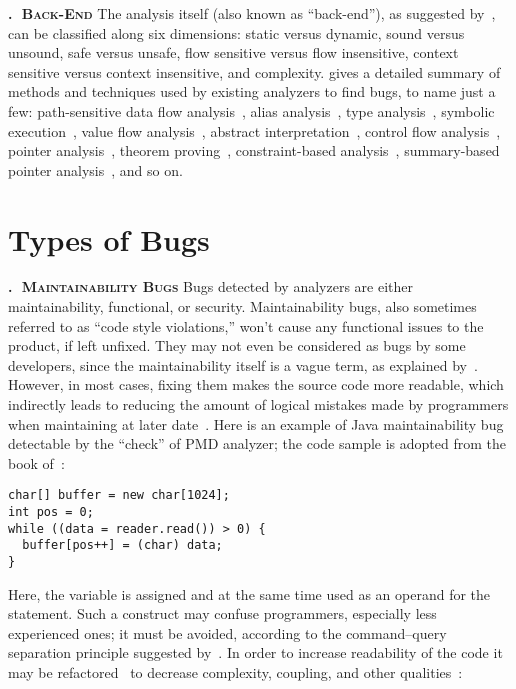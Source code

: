 \documentclass[nosecurity,nobrand]{huawei}
\newcounter{sector}[section]
\renewcommand\thesector{\thesection.\arabic{sector}}
\newcommand{\sector}[1]{\refstepcounter{sector}\vspace{6pt}\textbf{\textsc{\thesector $\;$ #1}}\quad}
\begin{document}
\sector{Back-End}
The analysis itself (also known as ``back-end''),
as suggested by~\citet{binkley2007source},
can be classified along six dimensions: static versus dynamic, sound versus unsound,
safe versus unsafe, flow sensitive versus flow insensitive,
context sensitive versus context insensitive, and complexity.
\citet{gosain2015static} gives a detailed summary of methods and techniques
used by existing analyzers to find bugs, to name just a few:
path-sensitive data flow analysis~\citep{kremenek2008},
alias analysis~\citep{aliasanalysis},
type analysis~\citep{wand1987simple},
symbolic execution~\citep{Slaby2013AutomaticBT},
value flow analysis~\citep{svf},
abstract interpretation~\citep{Slaby2013AutomaticBT},
control flow analysis~\citep{allen1970control},
pointer analysis~\citep{smaragdakis2015pointer},
theorem proving~\citep{darvas2005theorem},
constraint-based analysis~\citep{ConstraintAnalysis},
summary-based pointer analysis~\citep{PointerAnalysis},
and so on.

\section{Types of Bugs}

\sector{Maintainability Bugs}
Bugs detected by analyzers are either maintainability, functional, or security.
Maintainability bugs, also sometimes referred to as ``code style violations,''
won't cause any functional issues to the product, if left unfixed.
They may not even be considered as bugs by some developers, since
the maintainability itself is a vague term, as explained by~\citet{broy2006demystifying}.
However, in most cases, fixing them makes the source code more readable,
which indirectly leads to
reducing the amount of logical mistakes made by programmers when maintaining at
later date~\citep{posnett2011simpler}.
Here is an example
of Java maintainability bug detectable by the
\href{https://pmd.github.io/latest/pmd_rules_ecmascript_codestyle.html#assignmentinoperand}{}
``check'' of PMD analyzer; the code sample is adopted
from the book of~\citet[p.475]{sierra2005head}:

\begin{verbatim}
char[] buffer = new char[1024];
int pos = 0;
while ((data = reader.read()) > 0) {
  buffer[pos++] = (char) data;
}
\end{verbatim}

Here, the variable  is assigned and at the same time used
as an operand for the  statement. Such a construct
may confuse programmers, especially less experienced ones; it must be avoided,
according to the command–query separation principle suggested by~\citet{meyer1997object}.
In order to increase
readability of the code it may be refactored~\citep{fowler2018refactoring}
to decrease complexity, coupling, and other qualities~\citep{yamashita2012code}:
\end{document}
